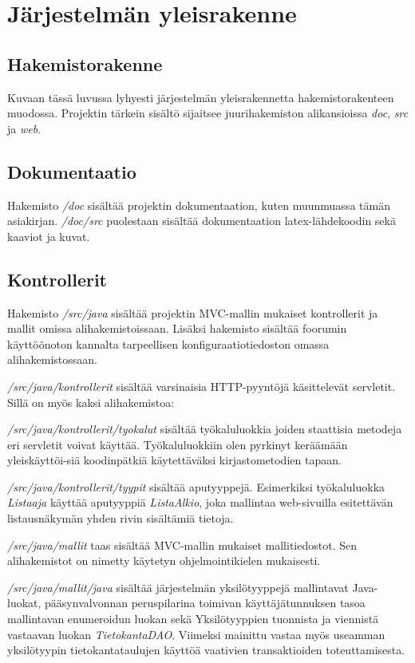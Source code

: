 \documentclass[11pt]{article}
\begin{document}
\newpage
\thispagestyle{plain}
	\section{Järjestelmän yleisrakenne}
		\subsection{Hakemistorakenne}
			Kuvaan tässä luvussa lyhyesti järjestelmän yleisrakennetta hakemistorakenteen muodossa.
			Projektin tärkein sisältö sijaitsee juurihakemiston alikansioissa \emph{doc}, \emph{src} ja
			\emph{web}.
	
		\subsection{Dokumentaatio}
			Hakemisto \emph{/doc} sisältää projektin dokumentaation, kuten muunmuassa tämän asiakirjan.
			\emph{/doc/src} puolestaan sisältää dokumentaation latex-lähdekoodin sekä kaaviot ja kuvat.
			
		\subsection{Kontrollerit}
			Hakemisto \emph{/src/java} sisältää projektin MVC-mallin mukaiset kontrollerit ja mallit omissa
			alihakemistoissaan. Lisäksi hakemisto sisältää foorumin käyttöönoton kannalta tarpeellisen
			konfiguraatiotiedoston omassa alihakemistossaan.
			
			\emph{/src/java/kontrollerit} sisältää varsinaisia HTTP-pyyntöjä käsittelevät servletit. Sillä on
			myös kaksi alihakemistoa:
			
			\emph{/src/java/kontrollerit/tyokalut} sisältää työkaluluokkia joiden staattisia metodeja eri
			servletit voivat käyttää. Työkaluluokkiin olen pyrkinyt keräämään yleiskäyttöi-siä koodinpätkiä
			käytettäväksi kirjastometodien tapaan.
			
			\emph{/src/java/kontrollerit/tyypit} sisältää aputyyppejä. Esimerkiksi työkaluluokka
			\emph{Listaaja} käyttää aputyyppiä \emph{ListaAlkio}, joka mallintaa web-sivuilla esitettävän
			listausnäkymän yhden rivin sisältämiä tietoja.
			
			\emph{/src/java/mallit} taas sisältää MVC-mallin mukaiset mallitiedostot. Sen alihakemistot on
			nimetty käytetyn ohjelmointikielen mukaisesti.
			
			\emph{/src/java/mallit/java} sisältää järjestelmän yksilötyyppejä mallintavat Java-luokat,
			pääsynvalvonnan peruspilarina toimivan käyttäjätunnuksen tasoa mallintavan enumeroidun luokan
			sekä Yksilötyyppien tuonnista ja viennistä vastaavan luokan \emph{TietokantaDAO}. Viimeksi
			mainittu vastaa myös useamman yksilötyypin tietokantataulujen käyttöä vaativien transaktioiden
			toteuttamisesta.
			
\end{document}
